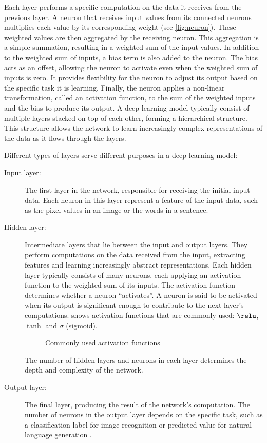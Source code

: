 Each layer performs a specific computation on the data it receives from the previous layer.
A neuron that receives input values from its connected neurons multiplies each value by its corresponding weight (see \cref{fig:neuron}).
These weighted values are then aggregated by the receiving neuron.
This aggregation is a simple summation, resulting in a weighted sum of the input values.
In addition to the weighted sum of inputs, a bias term is also added to the neuron.
The bias acts as an offset, allowing the neuron to activate even when the weighted sum of inputs is zero.
It provides flexibility for the neuron to adjust its output based on the specific task it is learning.
Finally, the neuron applies a non-linear transformation, called an activation function, to the sum of the weighted inputs and the bias to produce its output.
A deep learning model typically consist of multiple layers stacked on top of each other, forming a hierarchical structure.
This structure allows the network to learn increasingly complex representations of the data as it flows through the layers.

Different types of layers serve different purposes in a deep learning model:
\begin{description}
    \item[Input layer:] 
    The first layer in the network, responsible for receiving the initial input data.
    Each neuron in this layer represent a feature of the input data, such as the pixel values in an image or the words in a sentence.
    \item[Hidden layer:] 
    Intermediate layers that lie between the input and output layers.
    They perform computations on the data received from the input, extracting features and learning increasingly abstract representations.
    Each hidden layer typically consists of many neurons, each applying an activation function to the weighted sum of its inputs.
    The activation function determines whether a neuron ``activates''.
    A neuron is said to be activated when its output is significant enough to contribute to the next layer's computations.
     shows activation functions that are commonly used: $\relu$, $\tanh$ and $\sigma$ (sigmoid).

    \begin{figure}[hbtp]
        \centering    
        
        \caption{Commonly used activation functions}
        \label{fig:activation_functions}
    \end{figure} 

    The number of hidden layers and neurons in each layer determines the depth and complexity of the network.
    \item[Output layer:] 
    The final layer, producing the result of the network's computation.
    The number of neurons in the output layer depends on the specific task, such as a classification label for image recognition or predicted value for natural language generation \cite{goodfellowDeepLearning2016}.
\end{description}

